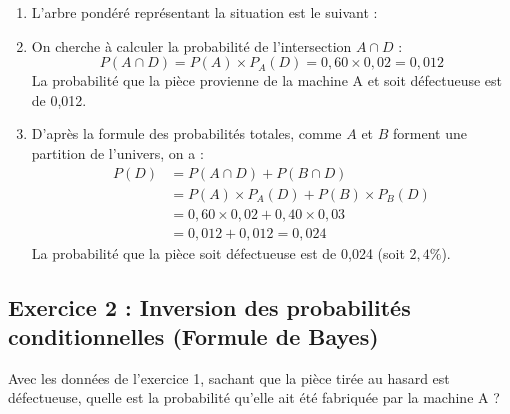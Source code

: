 \begin{enumerate}
    \item L'arbre pondéré représentant la situation est le suivant :
    \begin{center}
    \end{center}
    
    \item On cherche à calculer la probabilité de l'intersection $A \cap D$ :
    \[
    P(A \cap D) = P(A) \times P_A(D) = 0,60 \times 0,02 = 0,012
    \]
    La probabilité que la pièce provienne de la machine A et soit défectueuse est de 0,012.
    
    \item D'après la formule des probabilités totales, comme $A$ et $B$ forment une partition de l'univers, on a :
    \[
    \begin{aligned}
    P(D) &= P(A \cap D) + P(B \cap D) \\
    &= P(A) \times P_A(D) + P(B) \times P_B(D) \\
    &= 0,60 \times 0,02 + 0,40 \times 0,03 \\
    &= 0,012 + 0,012 = 0,024
    \end{aligned}
    \]
    La probabilité que la pièce soit défectueuse est de 0,024 (soit $2,4\%$).
\end{enumerate}

\subsection*{Exercice 2 : Inversion des probabilités conditionnelles (Formule de Bayes)}
Avec les données de l'exercice 1, sachant que la pièce tirée au hasard est défectueuse, quelle est la probabilité qu'elle ait été fabriquée par la machine A ?

